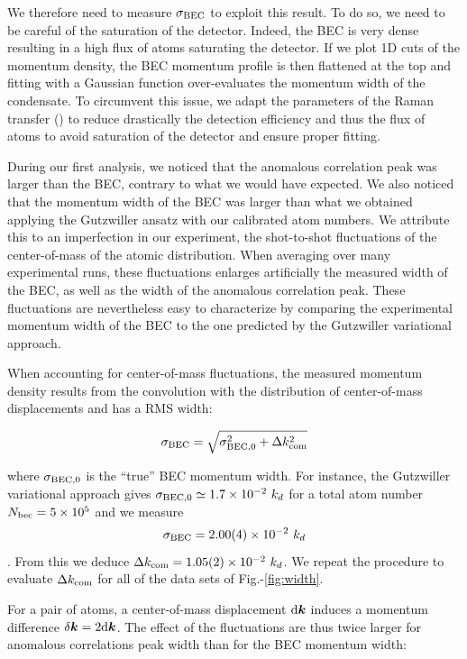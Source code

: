 We therefore need to measure $\sigma_{\rm{BEC}}$ to exploit this result. To do so, we need to be careful of the saturation of the detector. Indeed, the BEC is very dense resulting in a high flux of atoms saturating the detector. If we plot 1D cuts of the momentum density, the BEC momentum profile is then flattened at the top and fitting with a Gaussian function over-evaluates the momentum width of the condensate. To circumvent this issue, we adapt the parameters of the Raman transfer () to reduce drastically the detection efficiency and thus the flux of atoms to avoid saturation of the detector and ensure proper fitting.

During our first analysis, we noticed that the anomalous correlation peak was larger than the BEC, contrary to what we would have expected. We also noticed that the momentum width of the BEC was larger than what we obtained applying the Gutzwiller ansatz with our calibrated atom numbers. We attribute this to an imperfection in our experiment, the shot-to-shot fluctuations of the center-of-mass of the atomic distribution. When averaging over many experimental runs, these fluctuations enlarges artificially the measured width of the BEC, as well as the width of the anomalous correlation peak. These fluctuations are nevertheless easy to characterize by comparing the experimental momentum width of the BEC to the one predicted by the Gutzwiller variational approach.

When accounting for center-of-mass fluctuations, the measured momentum density results from the convolution with the distribution of center-of-mass displacements and has a RMS width:

\begin{equation}
    \sigma_{\rm{BEC}}=\sqrt{\sigma_{\rm{BEC},0}^2+\Delta k_{\rm{com}}^2}
\end{equation}

\noindent where $\sigma_{\rm{BEC},0}$ is the ``true'' BEC momentum width. For instance, the Gutzwiller variational approach gives  $\sigma_{\rm{BEC},0} \simeq 1.7 \times 10^{-2} \ k_d$ for a total atom number $N_{\rm{bec}} = 5 \times 10^5$ and we measure $$\sigma_{\rm BEC} = 2.00(4) \times 10^{-2} \ k_d$$. From this we deduce $\Delta k_{\rm{com}}=1.05(2) \times 10^{-2} \ k_d$. We repeat the procedure to evaluate $\Delta k_{\rm{com}}$ for all of the data sets of Fig.-\ref{fig:width}.

For a \kmk pair of atoms, a center-of-mass displacement ${\rm{d}} \bm{k}$ induces a momentum difference $\delta \bm{k}=2 {\rm{d}} \bm{k}$. The effect of the fluctuations are thus twice larger for anomalous correlations peak width than for the BEC momentum width:

